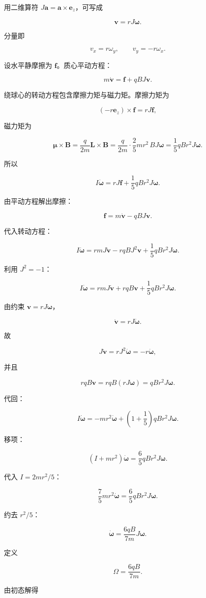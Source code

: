 \documentclass[12pt,a4paper,UTF8]{ctexart}
\begin{document}
用二维算符 \(J\bm a=\bm a\times\bm e_z\)，可写成

\[\boxed{\bm v=rJ\bm\omega}.\]

分量即

\[v_x=r\omega_y,\qquad v_y=-r\omega_x.\]

设水平静摩擦为 \(\bm f\)。质心平动方程：

\[m\dot{\bm v}=\bm f+qB J\bm v.\]

绕球心的转动方程包含摩擦力矩与磁力矩。摩擦力矩为

\[(-r\bm e_z)\times\bm f=rJ\bm f,\]

磁力矩为

\[\bm\mu\times\bm B
=\frac{q}{2m}\bm L\times\bm B
=\frac{q}{2m}\cdot\frac25mr^2\,B J\bm\omega
=\frac15qBr^2J\bm\omega.\]

所以

\[I\dot{\bm\omega}=rJ\bm f+\frac15qBr^2J\bm\omega.\]

由平动方程解出摩擦：

\[\bm f=m\dot{\bm v}-qBJ\bm v.\]

代入转动方程：

\[I\dot{\bm\omega}
=rmJ\dot{\bm v}-rqBJ^2\bm v+\frac15qBr^2J\bm\omega.\]

利用 \(J^2=-1\)：

\[I\dot{\bm\omega}
=rmJ\dot{\bm v}+rqB\bm v+\frac15qBr^2J\bm\omega.\]

由约束 \(\bm v=rJ\bm\omega\)，

\[\dot{\bm v}=rJ\dot{\bm\omega}.\]

故

\[J\dot{\bm v}=rJ^2\dot{\bm\omega}=-r\dot{\bm\omega},\]

并且

\[rqB\bm v=rqB(rJ\bm\omega)=qBr^2J\bm\omega.\]

代回：

\[I\dot{\bm\omega}
=-mr^2\dot{\bm\omega}
+\left(1+\frac15\right)qBr^2J\bm\omega.\]

移项：

\[(I+mr^2)\dot{\bm\omega}=\frac65qBr^2J\bm\omega.\]

代入 \(I=2mr^2/5\)：

\[\frac75mr^2\dot{\bm\omega}=\frac65qBr^2J\bm\omega.\]

约去 \(r^2/5\)：

\[\dot{\bm\omega}=\frac{6qB}{7m}J\bm\omega.\]

定义

\[\Omega=\frac{6qB}{7m}.\]

由初态解得
\end{document}
